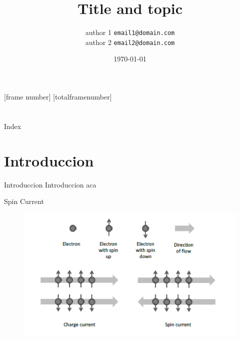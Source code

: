 \documentclass[handout,t]{beamer}
\title[Topic]{Title and topic}
\author[if you want put here who aro you going to present or the name organization]
{author 1 \texttt{email1@domain.com} \\author 2 \texttt{email2@domain.com}\\}
\date{\today}
\begin{document}
[frame number]
[totalframenumber]

\frame{\titlepage}
\section[]{}
\begin{frame}{Index}
  \tableofcontents
\end{frame}
\section{Introduccion}
\begin{frame}{Introduccion}
	Introduccion aca
\end{frame}

\begin{frame}{Spin Current}
	\begin{figure}[!ht]
		\centering
		\includegraphics[width=0.7\linewidth]{../figures/spinchargecurent.png}
		\label{fig:spinchargecurent}
	\end{figure}
\end{frame}
\end{document}
